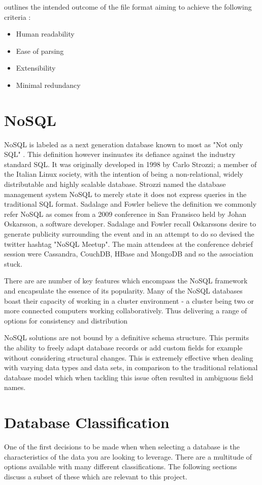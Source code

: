\cite{obo} outlines the intended outcome of the file format aiming to achieve the following criteria :
\begin{itemize}
\item Human readability
\item Ease of parsing
\item Extensibility
\item Minimal redundancy
\end{itemize}

\section{NoSQL}\label{nosql}
NoSQL is labeled as a next generation database known to most as "Not only SQL" \cite{nosql1}. This definition however insinuates its defiance against the industry standard SQL. It was originally developed in 1998 by Carlo Strozzi; a member of the Italian Linux society, with the intention of being a non-relational, widely distributable and highly scalable database. Strozzi named the database management system NoSQL to merely state it does not express queries in the traditional SQL format. Sadalage and Fowler believe the definition we commonly refer NoSQL as comes from a 2009 conference in San Fransisco held by Johan Oskarsson, a software developer. Sadalage and Fowler recall Oskarssons desire to generate publicity surrounding the event and in an attempt to do so devised the twitter hashtag "NoSQL Meetup". The main attendees at the conference debrief session were Cassandra, CouchDB, HBase and MongoDB and so the association stuck. \cite{nosql1}

There are are number of key features which encompass the NoSQL framework and encapsulate the essence of its popularity. Many of the NoSQL databases boast their capacity of working in a cluster environment - a cluster being two or more connected computers working collaboratively. Thus delivering a range of options for consistency and distribution  \cite{nosql1}

NoSQL solutions are not bound by a definitive schema structure. This permits the ability to freely adapt database records or add custom fields for example without considering structural changes. This is extremely effective when dealing with varying data types and data sets, in comparison to the traditional relational database model which when tackling this issue often resulted in ambiguous field names.  \cite{nosql1}

\section{Database Classification}\label{dbclass}
One of the first decisions to be made when when selecting a database is the characteristics of the data you are looking to leverage. \cite{nosql2} There are a multitude of options available with many different classifications. The following sections discuss a subset of these which are relevant to this project.


